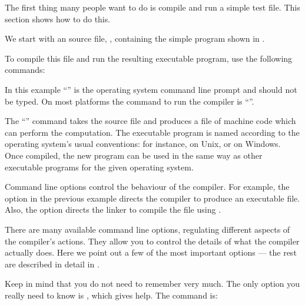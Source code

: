 
The first thing many people want to do is compile and run
a simple test file.  This section shows how to do this.

We start with an \asharp{} source file, ,
containing the simple program shown in .


To compile this file and run the resulting executable program, use
the following commands:


In this example ``\osprompt{}'' is the operating system command line
prompt and should not be typed.
On most platforms the command to run the \asharp{} compiler is
``\asharpcmd{}''.

The ``\asharpcmd{}'' command takes the source file 
and produces a file of machine code which can perform the computation.
The executable program is named according to the operating system's usual
conventions: for instance,  on Unix, or  on Windows.
Once compiled, the new program can be used in the same way as
other executable programs for the given operating system.

Command line options control the behaviour of the compiler.
For example, the option  in the previous example
directs the compiler to produce an executable file. Also,
the option  directs the linker to compile
the file using .

There are many available command line options, regulating different
aspects of the compiler's actions.
They allow you to control the details of what the compiler
actually does.  Here we point out a few of the most important options
--- the rest are described in detail in .

Keep in mind that you do not need to remember very much.
The only option you really need to know is ,
which gives help.  The command is:

\begin{small}
\osprompt\ 
\end{small}


